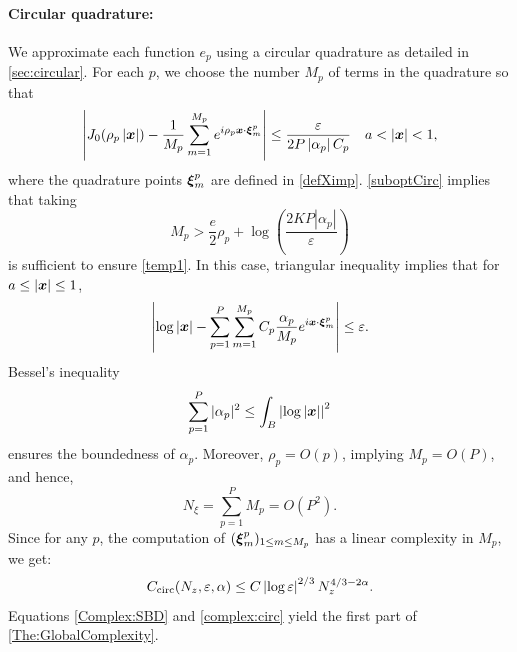 \documentclass{article}
\begin{document}
\paragraph{Circular quadrature:} We approximate each function $e_p$ using a circular quadrature as detailed in \autoref{sec:circular}. For each $p$, we choose the number $M_p$ of terms in the quadrature so that
\begin{equation}
	\label{temp1}
	\left\lvert J_0 (\rho_p \left\lvert \boldsymbol{x} \right\rvert) - \dfrac{1}{M_p}\sum_{m=1}^{M_p} e^{i \rho_p \boldsymbol{x} \cdot \boldsymbol{\xi}_m^p} \right\rvert \leq \frac{\varepsilon}{2P \left\lvert \alpha_p \right\rvert C_p} \quad a < \left\lvert \boldsymbol{x} \right\rvert < 1,
\end{equation}
where the quadrature points $\boldsymbol{\xi}_m^p$ are defined in  \eqref{defXimp}. \autoref{suboptCirc} implies that taking
\begin{equation}
	M_p > \frac{e}{2} \rho_p + \log\left(\dfrac{2KP |\alpha_p|}{\varepsilon}\right)
\end{equation} 
is sufficient to ensure \eqref{temp1}. In this case, triangular inequality implies that for $a \leq \left\lvert \boldsymbol{x} \right\rvert \leq 1$, 
\[ \left\lvert \log\left\lvert \boldsymbol{x} \right\rvert - \sum_{p=1}^{P} \sum_{m = 1}^{M_p} C_p \frac{\alpha_p}{M_p}e^{i \boldsymbol{x}\cdot \boldsymbol{\xi}^p_m} \right\rvert \leq \varepsilon.\]
Bessel's inequality
\[\sum_{p=1}^P{|\alpha_p|^2} \leq \int_{B} \left\lvert \log|\boldsymbol{x}| \right\rvert^2\]
ensures the boundedness of $\alpha_p$. Moreover, $\rho_p = O(p)$, implying $M_p = O(P)$, and hence, 
\begin{equation}
	\label{eq:NxiEnFonctionDeP}
	N_\xi = \sum_{p = 1}^P M_p = O(P^2).
\end{equation}
Since for any $p$, the computation of $(\boldsymbol{\xi}_m^p)_{1\leq m \leq M_p}$ has a linear complexity in $M_p$, we get:
\begin{equation}
	\label{complex:circ}
	C_{\textup{circ}}(N_z,\varepsilon,\alpha) \leq C \left\lvert \log\varepsilon \right\rvert^{2/3} N_z^{4/3 - 2\alpha}.
\end{equation} 
Equations \eqref{Complex:SBD} and \eqref{complex:circ} yield the first part of \autoref{The:GlobalComplexity}.
																																																		
\end{document}
